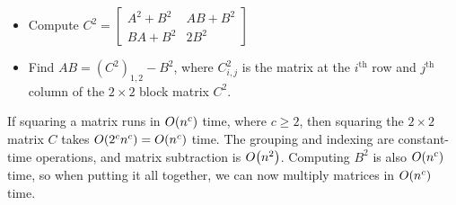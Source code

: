 \documentclass[11pt]{article}
\let\origleft\left
\let\origright\right
\renewcommand{\left}{\mathopen{}\mathclose\bgroup\origleft}
\renewcommand{\right}{\aftergroup\egroup\origright}
\newcommand{\p}[1]{\left(#1\right)}
\newcommand{\BigOh}[1]{O\p{#1}}
\begin{document}
\begin{enumerate}[(a)]
\begin{itemize}
\item Compute $C^2 = \begin{bmatrix} A^2+B^2 & AB+B^2 \\ BA+B^2 & 2B^2 \end{bmatrix}$
\item Find $AB = (C^2)_{1,2} - B^2$, where $C^2_{i,j}$ is the matrix at the $i^{\text{th}}$ row and $j^{\text{th}}$ column of the $2\times 2$ block matrix $C^2$.
\end{itemize}
If squaring a matrix runs in $\BigOh{n^c}$ time, where $c\geq 2$, then squaring the $2\times 2$ matrix $C$ takes $\BigOh{2^cn^c} = \BigOh{n^c}$ time. The grouping and indexing are constant-time operations, and matrix subtraction is $\BigOh{n^2}$. Computing $B^2$ is also $\BigOh{n^c}$ time, so when putting it all together, we can now multiply matrices in $\BigOh{n^c}$ time.
\end{enumerate}


\newpage
\end{document}
